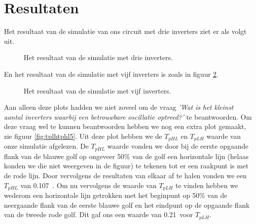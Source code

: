 \documentclass{scrartcl}  %
\begin{document}
\section{Resultaten}
Het resultaat van de simulatie van ons circuit met drie inverters ziet er als volgt uit.
\begin{figure}[H]
\centering
                \setlength{} 
                \setlength{}
                
                \caption{Het resultaat van de simulatie met drie inverters.}
                \label{fig:meetdrie}
\end{figure}
En het resultaat van de simulatie met vijf inverters is zoals in figuur \ref{fig:meetvijf}.
\begin{figure}[H]
\centering
                \setlength{} 
                \setlength{}
                
                \caption{Het resultaat van de simulatie met vijf inverters.}
                \label{fig:meetvijf}
\end{figure}
Aan alleen deze plots hadden we niet zoveel om de vraag {\it 'Wat is het kleinst aantal inverters waarbij een betrouwbare oscillatie optreed?'} te beantwoorden. Om deze vraag wel te kunnen beantwoorden hebben we nog een extra plot gemaakt, zie figuur \ref{fig:tplhtphl5}. Uit deze plot hebben we de $T_{pHL}$ en $T_{pLH}$ waarde van onze simulatie afgelezen. De $T_{pHL}$ waarde vonden we door bij de eerste opgaande flank van de blauwe golf op ongeveer 50\% van de golf een horizontale lijn (helaas konden we die niet weergeven in de figuur) te tekenen tot er een raakpunt is met de rode lijn. Door vervolgens de resultaten van elkaar af te halen vonden we een $T_{pHL}$ van 0.107\nano\second\ . Om nu vervolgens de waarde van $T_{pLH}$ te vinden hebben we wederom een horizontale lijn getrokken met het beginpunt op 50\% van de neergaande flank van de eerste blauwe golf en het eindpunt op de opgaande flank van de tweede rode golf. Dit gaf ons een waarde van 0.21\nano\second\ voor $T_{pLH}$.
\end{document}

